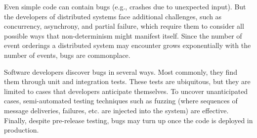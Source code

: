 
Even simple code can contain bugs (e.g., crashes due to unexpected input). But the developers
of distributed systems face
additional challenges, such as concurrency, asynchrony, and partial failure, which require them to
consider all possible ways that non-determinism might manifest itself. Since
the number of event orderings %
a distributed system may encounter grows exponentially with the number of events, bugs are commonplace.


% 

Software developers discover bugs in several ways.
Most commonly, they find them through unit and integration tests. These tests are ubiquitous, but they are limited to cases that developers
anticipate themselves. To uncover unanticipated cases, semi-automated testing techniques such as fuzzing (where
sequences of message deliveries, failures, etc. are injected into the system) are effective.
Finally, despite pre-release testing, bugs may turn up once the code is deployed in production.

